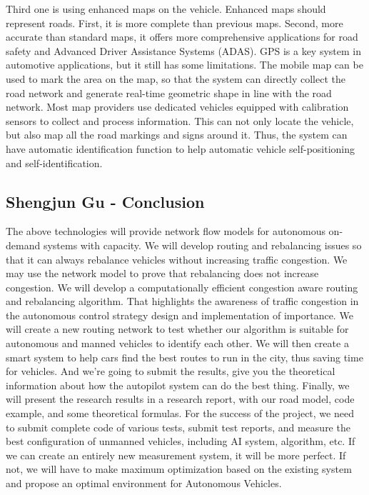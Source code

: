 \documentclass[onecolumn, draftclsnofoot,10pt, compsoc]{IEEEtran}
\begin{document}
Third one is using enhanced maps on the vehicle.
Enhanced maps should represent roads.
First, it is more complete than previous maps.
Second, more accurate than standard maps, it offers more comprehensive applications for road safety and Advanced Driver Assistance Systems (ADAS).
GPS is a key system in automotive applications, but it still has some limitations.
The mobile map can be used to mark the area on the map, so that the system can directly collect the road network and generate real-time geometric shape in line with the road network.
Most map providers use dedicated vehicles equipped with calibration sensors to collect and process information.
This can not only locate the vehicle, but also map all the road markings and signs around it.
Thus, the system can have automatic identification function to help automatic vehicle self-positioning and self-identification.
\subsection{Shengjun Gu - Conclusion}
The above technologies will provide network flow models for autonomous on-demand systems with capacity.
We will develop routing and rebalancing issues so that it can always rebalance vehicles without increasing traffic congestion.
We may use the network model to prove that rebalancing does not increase congestion.
We will develop a computationally efficient congestion aware routing and rebalancing algorithm.
That highlights the awareness of traffic congestion in the autonomous control strategy design and implementation of importance.
We will create a new routing network to test whether our algorithm is suitable for autonomous and manned vehicles to identify each other.
We will then create a smart system to help cars find the best routes to run in the city, thus saving time for vehicles.
And we're going to submit the results, give you the theoretical information about how the autopilot system can do the best thing.
Finally, we will present the research results in a research report, with our road model, code example, and some theoretical formulas.
For the success of the project, we need to submit complete code of various tests, submit test reports, and measure the best configuration of unmanned vehicles, including AI system, algorithm, etc.
If we can create an entirely new measurement system, it will be more perfect.
If not, we will have to make maximum optimization based on the existing system and propose an optimal environment for Autonomous Vehicles.
\end{document}
